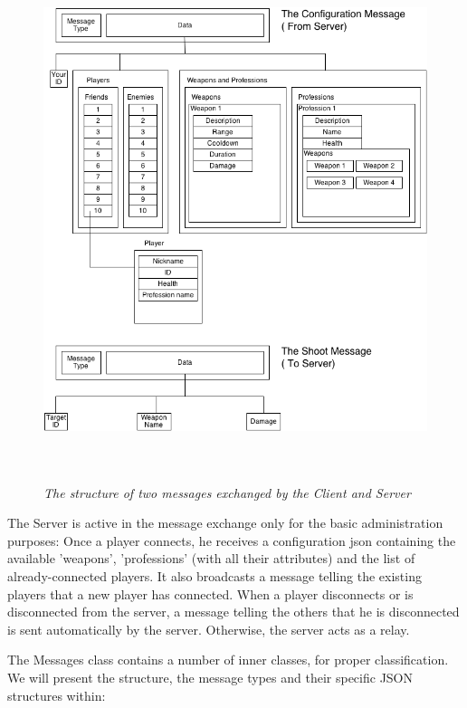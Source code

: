 \begin{figure}
\includegraphics[height=6in,width=5.44in]{./images/diagrams/message_structures.png}
\caption{\small \sl The structure of two messages exchanged by the Client and
Server
\label{fig:message_structures}}
\end{figure}

The Server is active in the message exchange only for the basic administration
purposes: Once a player connects, he receives a configuration json containing
the available 'weapons', 'professions' (with all their attributes) and the list
of already-connected players. It also broadcasts a message telling the existing
players that a new player has connected. When a player disconnects or is
disconnected from the server, a message telling the others that he is
disconnected is sent automatically by the server. Otherwise, the server acts as
a relay.\newline

The Messages class contains a number of inner classes, for proper
classification. We will present the structure, the message types and their
specific JSON structures within:

